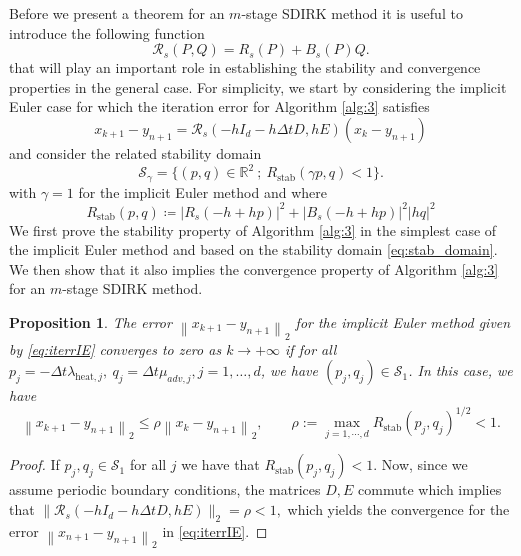 \documentclass[10pt,a4paper]{article}
\newtheorem{proposition}[theorem]{Proposition}
\def \calA{\mathcal{A}}
\newcommand{\norm}[1]{\left\lVert #1 \right\rVert}
\begin{document}
Before we present a theorem for an $m$-stage SDIRK method it is useful to introduce the following function
\begin{equation}\label{eq:stabRIE}
\mathcal{R}_{s}(P,Q) =  R_s(P) + B_s(P)Q.
\end{equation}
that will play an important role in establishing the stability and convergence properties in the general case. For simplicity, we start by considering the implicit Euler case for which the iteration error for Algorithm \ref{alg:3} satisfies 
\begin{equation}\label{eq:iterrIE}
x_{k+1}-y_{n+1} = \mathcal{R}_{s}(-hI_d - h\Delta t D,hE)(x_k-y_{n+1})
\end{equation}
and consider the related stability domain 
\begin{equation} \label{eq:stab_domain}
{\mathcal{S}_\gamma} = \{(p,q) \in \mathbb{R}^2\ ;\ R_{\text{stab}}({\gamma} p,q) <1 \}.
\end{equation}
{with $\gamma=1$ for the implicit Euler method and} where
\[
R_{\text{stab}}(p,q)\coloneqq |R_{s}(-h+h p)|^2 + |B_{s}(-h+h p)|^2|h q|^2
\]
We first prove the stability property of Algorithm \ref{alg:3} in the simplest case of the implicit Euler method and based on the stability domain \eqref{eq:stab_domain}. We then show that it also implies the convergence property of Algorithm \ref{alg:3} for an $m$-stage SDIRK method. 

\begin{proposition}\label{prop:rate1}
The error $\norm{x_{k+1}-y_{n+1}}_{2}$ for the implicit Euler method given by \eqref{eq:iterrIE} converges to zero as $k\rightarrow+\infty$ if for all $p_{j}=-\Delta t \lambda_{\text{heat},j}, \ q_{j}=\Delta t\mu_{adv,j}, j=1,\ldots,d$, we have $(p_{j},q_{j}) \in \mathcal{S}_1$. In this case, we have
$$
\norm{x_{k+1}-y_{n+1}}_{2} \leq \rho\norm{x_{k}-y_{n+1}}_{2},\qquad \rho := \max_{j=1,\cdots,d} R_{\text{stab}}(p_j,q_j)^{1/2}<1.
$$
\end{proposition}
\begin{proof}
If $p_{j},q_{j} \in \mathcal{S}_1$ for all $j$ we have that
 $R_{\text{stab}}(p_{j},q_{j})<1$. Now, since we assume periodic boundary conditions, the matrices   $D,E$ commute which implies that  
$ 
 \|\mathcal{R}_{s}(-hI_d - h\Delta t D,hE) \|_2 = \rho
 <1,
$
which yields the convergence for the error $\norm{x_{n+1}-y_{n+1}}_{2}$ in \eqref{eq:iterrIE}.     
\end{proof}
\end{document}
